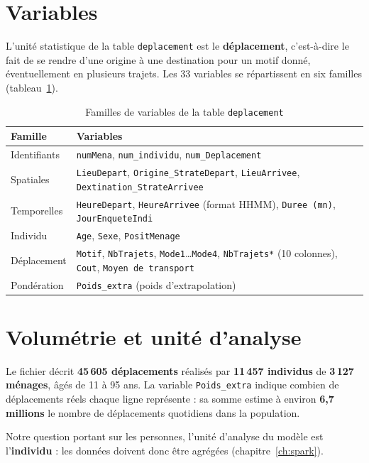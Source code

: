 \documentclass[12pt,a4paper]{report}
\newcommand{\code}[1]{\texttt{\small #1}}
\newcommand{\1}{\mathbf{1}}
\begin{document}
\section{Variables}
L'unité statistique de la table \code{deplacement} est le \textbf{déplacement}, c'est-à-dire le fait de se rendre d'une origine à une destination pour un motif donné, éventuellement en plusieurs trajets. Les 33 variables se répartissent en six familles (tableau~\ref{tab:variables}).

\begin{table}[H]
\centering
\caption{Familles de variables de la table \code{deplacement}}\label{tab:variables}
\small
\begin{tabularx}{\linewidth}{@{}lX@{}}
\toprule
\textbf{Famille} & \textbf{Variables} \\
\midrule
Identifiants & \code{numMena}, \code{num\_individu}, \code{num\_Deplacement} \\
Spatiales & \code{LieuDepart}, \code{Origine\_StrateDepart}, \code{LieuArrivee}, \code{Dextination\_StrateArrivee} \\
Temporelles & \code{HeureDepart}, \code{HeureArrivee} (format HHMM), \code{Duree (mn)}, \code{JourEnqueteIndi} \\
Individu & \code{Age}, \code{Sexe}, \code{PositMenage} \\
Déplacement & \code{Motif}, \code{NbTrajets}, \code{Mode1}…\code{Mode4}, \code{NbTrajets*} (10 colonnes), \code{Cout}, \code{Moyen de transport} \\
Pondération & \code{Poids\_extra} (poids d'extrapolation) \\
\bottomrule
\end{tabularx}
\end{table}

\section{Volumétrie et unité d'analyse}
Le fichier décrit \textbf{45\,605 déplacements} réalisés par \textbf{11\,457 individus} de \textbf{3\,127 ménages}, âgés de 11 à 95 ans. La variable \code{Poids\_extra} indique combien de déplacements réels chaque ligne représente : sa somme estime à environ \textbf{6,7 millions} le nombre de déplacements quotidiens dans la population.

Notre question portant sur les personnes, l'unité d'analyse du modèle est l'\textbf{individu} : les données doivent donc être agrégées (chapitre~\ref{ch:spark}).
\end{document}

